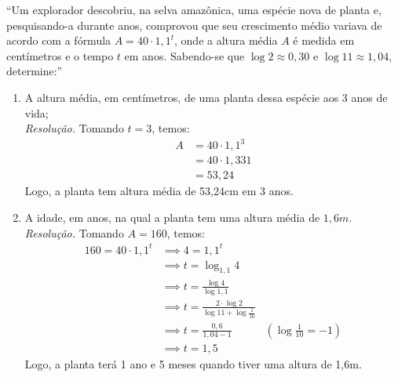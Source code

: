 \enquote{Um explorador descobriu, na selva amazônica, uma espécie nova de planta e, pesquisando-a durante anos, comprovou que seu crescimento médio variava de acordo com a fórmula $A = 40 \cdot 1,1^t$, onde a altura média $A$ é medida em centímetros e o tempo $t$ em anos. Sabendo-se que $\log 2 \approx 0,30$ e $\log 11 \approx 1,04$, determine:}
\begin{enumerate}
    \item A altura média, em centímetros, de uma planta dessa espécie aos 3 anos de vida; \\
    \emph{Resolução.} Tomando $t = 3$, temos:
    \begin{align*}
        A & = 40 \cdot 1,1^3 \\ & =
        40 \cdot 1,331 \\ & =
        53,24 
    \end{align*}
    Logo, a planta tem altura média de 53,24cm em 3 anos.
    \item A idade, em anos, na qual a planta tem uma altura média de $1,6m$. \\
    \emph{Resolução.} Tomando $A = 160$, temos:
    \begin{align*}
        160 = 40 \cdot 1,1^t & \implies 4 = 1,1^t \\ & \implies t = \log_{1,1} 4 \\ & \implies
        t = \frac{\log 4}{\log 1,1} \\ & \implies
        t = \frac{2 \cdot \log 2}{\log 11 + \log \frac{1}{10}} \\ & \implies
        t = \frac{0,6}{1,04 - 1} \quad & (\log \frac{1}{10} = -1)\\ & \implies
        t = 1,5
    \end{align*}
    Logo, a planta terá 1 ano e 5 meses quando tiver uma altura de 1,6m.
\end{enumerate}